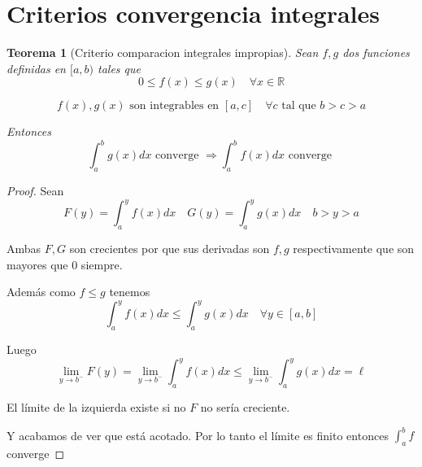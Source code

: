 \documentclass{article}
\theoremstyle{break}
\newtheorem{theorem}{Teorema}[section]
\begin{document}
\section{Criterios convergencia integrales}
\begin{theorem}[Criterio comparacion integrales impropias]
Sean $f,g$ dos funciones definidas en $[a,b)$ tales que 
\[ 0\leq f(x) \leq g(x)\quad \forall x \in \mathbb{R} \]

\[f(x),g(x) \text{ son integrables en } [a,c] \quad \forall c \text{ tal que }  b > c > a\]

Entonces \[ \int_{a}^{b} g(x)dx \text{ converge } \Longrightarrow \int_{a}^{b} f(x)dx \text{ converge }\]
\end{theorem}
\begin{proof}
Sean \[ F(y) =\int_{a}^{y} f(x)dx \quad G(y) = \int_{a}^{y} g(x)dx \quad b>y>a\]

Ambas $F,G$ son crecientes por que sus derivadas son $f,g$ respectivamente que son mayores que 0
siempre. 

Además como $f\leq g$ tenemos
\[ \int_{a}^{y} f(x)dx \leq \int_{a}^{y} g(x)dx \quad \forall y \in [a,b]\]

Luego \[ \lim_{y \rightarrow b^{-} } F(y) = \lim_{y \rightarrow b^{-}} \int_{a}^{y} f(x)dx \leq 
\lim_{y \rightarrow b^{-}}\int_{a}^{y} g(x)dx = \ell \]

El límite de la izquierda existe si no $F$ no sería creciente. 

Y acabamos de ver que está acotado. Por lo tanto el límite es finito entonces $\int_{a}^{b}  f$ converge
\end{proof}
\end{document}

